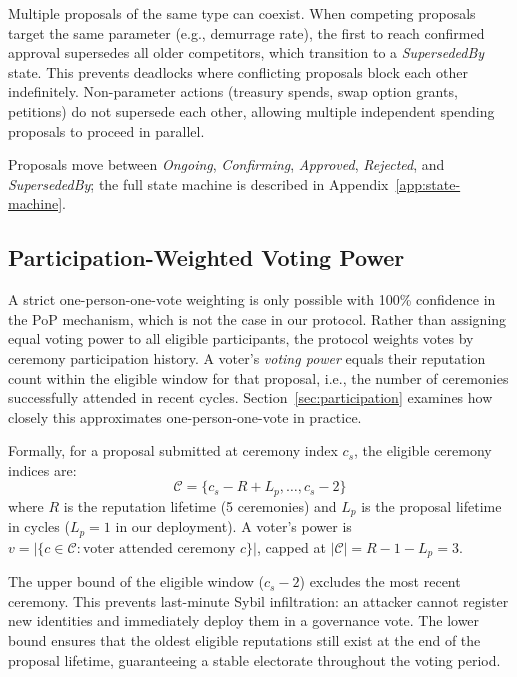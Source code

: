 \documentclass{svproc}
\begin{document}
Multiple proposals of the same type can coexist. When competing proposals target the same parameter (e.g., demurrage rate), the first to reach confirmed approval supersedes all older competitors, which transition to a \emph{SupersededBy} state. This prevents deadlocks where conflicting proposals block each other indefinitely. Non-parameter actions (treasury spends, swap option grants, petitions) do not supersede each other, allowing multiple independent spending proposals to proceed in parallel.

Proposals move between \emph{Ongoing}, \emph{Confirming}, \emph{Approved}, \emph{Rejected}, and \emph{SupersededBy}; the full state machine is described in Appendix~\ref{app:state-machine}.

\subsection{Participation-Weighted Voting Power}
\label{sec:voting-power}

A strict one-person-one-vote weighting is only possible with 100\% confidence in the PoP mechanism, which is not the case in our protocol. Rather than assigning equal voting power to all eligible participants, the protocol weights votes by ceremony participation history. A voter's \emph{voting power} equals their reputation count within the eligible window for that proposal, i.e., the number of ceremonies successfully attended in recent cycles. Section~\ref{sec:participation} examines how closely this approximates one-person-one-vote in practice.

Formally, for a proposal submitted at ceremony index $c_s$, the eligible ceremony indices are:
\begin{equation}
\label{eq:voting-window}
\mathcal{C} = \{c_s - R + L_p, \ldots, c_s - 2\}
\end{equation}
where $R$ is the reputation lifetime (5 ceremonies) and $L_p$ is the proposal lifetime in cycles ($L_p = 1$ in our deployment). A voter's power is $v = |\{c \in \mathcal{C} : \text{voter attended ceremony } c\}|$, capped at $|\mathcal{C}| = R - 1 - L_p = 3$.

The upper bound of the eligible window ($c_s - 2$) excludes the most recent ceremony. This prevents last-minute Sybil infiltration: an attacker cannot register new identities and immediately deploy them in a governance vote. The lower bound ensures that the oldest eligible reputations still exist at the end of the proposal lifetime, guaranteeing a stable electorate throughout the voting period.
\end{document}
